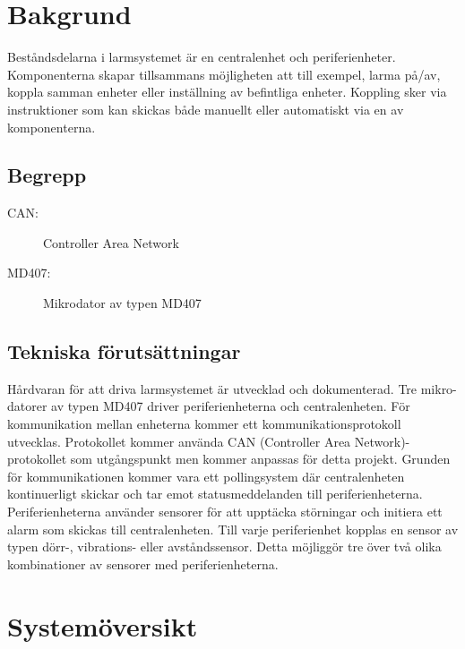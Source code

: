 \documentclass[a4paper]{article}
\begin{document}

\section{Bakgrund}

Beståndsdelarna i larmsystemet är en centralenhet och periferienheter. Komponenterna skapar tillsammans möjligheten att till exempel, larma på/av, koppla samman enheter eller inställning av befintliga enheter. Koppling sker via instruktioner som kan skickas både manuellt eller automatiskt via en av komponenterna.

\subsection{Begrepp}

\begin{description}
    \item[CAN:] Controller Area Network
    \item[MD407:] Mikrodator av typen MD407
\end{description}


\subsection{Tekniska förutsättningar}

Hårdvaran för att driva larmsystemet är utvecklad och dokumenterad. Tre mikro-datorer av typen MD407 driver periferienheterna och centralenheten. För kommunikation mellan enheterna kommer ett kommunikationsprotokoll utvecklas. Protokollet kommer använda CAN (Controller Area Network)-protokollet som utgångspunkt men kommer anpassas för detta projekt. Grunden för kommunikationen kommer vara ett pollingsystem där centralenheten kontinuerligt skickar och tar emot statusmeddelanden till periferienheterna. Periferienheterna använder sensorer för att upptäcka störningar och initiera ett alarm som skickas till centralenheten. Till varje periferienhet kopplas en sensor av typen dörr-, vibrations- eller avståndssensor. Detta möjliggör tre över två olika kombinationer av sensorer med periferienheterna.

\section{Systemöversikt}
\end{document}
